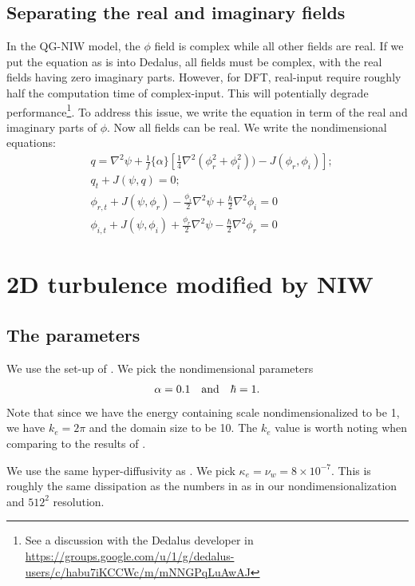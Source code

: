 \subsection{Separating the real and imaginary fields}
In the QG-NIW model, the $\phi$ field is complex while all other fields are real. If we put the equation as is into Dedalus, all fields must be complex, with the real fields having zero imaginary parts. However, for DFT, real-input require roughly half the computation time of complex-input. This will potentially degrade performance\footnote{See a discussion with the Dedalus developer in \url{https://groups.google.com/u/1/g/dedalus-users/c/habu7iKCCWc/m/mNNGPqLuAwAJ}}. To address this issue, we write the equation in term of the real and imaginary parts of $\phi$. Now all fields can be real. We write the nondimensional equations:
\begin{align}
    &q = \nabla^2\psi + \frac{1}{f}\{\alpha\}\left[\frac{1}{4}\nabla^2(\phi_r^2+\phi_i^2))-J(\phi_r,\phi_i)\right];\\
    &q_t + J(\psi,q) = 0;\\
    &\phi_{r,t}+J(\psi,\phi_r)-\frac{\phi_i}{2}\nabla^2\psi+\frac{\hbar}{2}\nabla^2\phi_i = 0\\
    &\phi_{i,t}+J(\psi,\phi_i)+\frac{\phi_r}{2}\nabla^2\psi-\frac{\hbar}{2}\nabla^2\phi_r = 0
\end{align}


\section{2D turbulence modified by NIW}
\subsection{The parameters}
We use the set-up of \cite[Tabel 4 \& \S 4.2]{RochaEtAl_18}. We pick the nondimensional parameters
\begin{align}
    \alpha = 0.1 \quad \mbox{and} \quad \hbar = 1.
\end{align}
Note that since we have the energy containing scale nondimensionalized to be 1, we have $k_e = 2\pi$ and the domain size to be 10. The $k_e$ value is worth noting when comparing to the results of \cite{RochaEtAl_18}.

We use the same hyper-diffusivity as \cite[(2.9a,b)]{RochaEtAl_18}. We pick $\kappa_e=\nu_w = 8\times 10^{-7}$. This is roughly the same dissipation as the numbers in \cite[Tabel 4]{RochaEtAl_18} as in our nondimensionalization and $512^2$ resolution.


